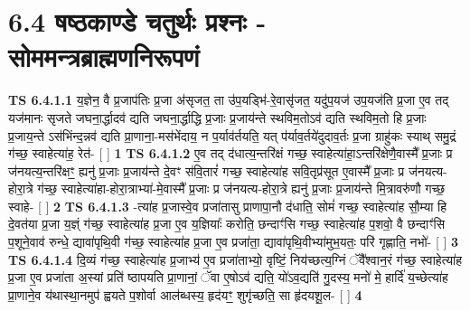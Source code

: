 \documentclass[17pt]{extarticle}
\begin{document}
     \section*{ 6.4       षष्ठकाण्डे चतुर्थः प्रश्नः - सोममन्त्रब्राह्मणनिरूपणं }
                                        \textbf{ TS 6.4.1.1} \newline
                  य॒ज्ञेन॒ वै प्र॒जाप॑तिः प्र॒जा अ॑सृजत॒ ता उ॑प॒यड्भि॑-रे॒वासृ॑जत॒ यदु॑प॒यज॑ उप॒यज॑ति प्र॒जा ए॒व तद् यज॑मानः सृजते जघना॒र्द्धादव॑ द्यति जघना॒र्द्धाद्धि प्र॒जाः प्र॒जाय॑न्ते स्थविम॒तोऽव॑ द्यति स्थविम॒तो हि प्र॒जाः प्र॒जाय॒न्ते ऽस॑भिंन्द॒न्नव॑ द्यति प्रा॒णाना॒-मस॑भेंदाय॒ न प॒र्याव॑र्तयति॒ यत् प॑र्याव॒र्तये॑दुदाव॒र्तः प्र॒जा ग्राहु॑कः स्याथ् समु॒द्रं ग॑च्छ॒ स्वाहेत्या॑ह॒ रेत॑- [  ] \textbf{  1} \newline
                  \newline
                                \textbf{ TS 6.4.1.2} \newline
                  ए॒व तद् द॑धात्य॒न्तरि॑क्षं गच्छ॒ स्वाहेत्या॑हा॒ऽन्तरि॑क्षेणै॒वास्मै᳚ प्र॒जाः प्र ज॑नयत्य॒न्तरि॑क्षꣳ॒॒ ह्यनु॑ प्र॒जाः प्र॒जाय॑न्ते दे॒वꣳ स॑वि॒तारं॑ गच्छ॒ स्वाहेत्या॑ह सवि॒तृप्र॑सूत ए॒वास्मै᳚ प्र॒जाः प्र ज॑नयत्य-होरा॒त्रे ग॑च्छ॒ स्वाहेत्या॑हा-होरा॒त्राभ्या॑-मे॒वास्मै᳚ प्र॒जाः प्र ज॑नयत्य-होरा॒त्रे ह्यनु॑ प्र॒जाः प्र॒जाय॑न्ते मि॒त्रावरु॑णौ गच्छ॒ स्वाहे- [  ] \textbf{  2} \newline
                  \newline
                                \textbf{ TS 6.4.1.3} \newline
                  -त्या॑ह प्र॒जास्वे॒व प्रजा॑तासु प्राणापा॒नौ द॑धाति॒ सोमं॑ गच्छ॒ स्वाहेत्या॑ह सौ॒म्या हि दे॒वत॑या प्र॒जा य॒ज्ञ्ं ग॑च्छ॒ स्वाहेत्या॑ह प्र॒जा ए॒व य॒ज्ञियाः᳚ करोति॒ छन्दाꣳ॑सि गच्छ॒ स्वाहेत्या॑ह प॒शवो॒ वै छन्दाꣳ॑सि प॒शूने॒वाव॑ रुन्धे॒ द्यावा॑पृथि॒वी ग॑च्छ॒ स्वाहेत्या॑ह प्र॒जा ए॒व प्रजा॑ता॒ द्यावा॑पृथि॒वीभ्या॑मुभ॒यतः॒ परि॑ गृह्णाति॒ नभो॑- [  ] \textbf{  3} \newline
                  \newline
                                \textbf{ TS 6.4.1.4} \newline
                  दि॒व्यं ग॑च्छ॒ स्वाहेत्या॑ह प्र॒जाभ्य॑ ए॒व प्रजा॑ताभ्यो॒ वृष्टिं॒ निय॑च्छत्य॒ग्निं ॅवै᳚श्वान॒रं ग॑च्छ॒ स्वाहेत्या॑ह प्र॒जा ए॒व प्रजा॑ता अ॒स्यां प्रति॑ ष्ठापयति प्रा॒णानां॒ ॅवा ए॒षोऽव॑ द्यति॒ यो॑ऽव॒द्यति॑ गु॒दस्य॒ मनो॑ मे॒ हार्दि॑ य॒च्छेत्या॑ह प्रा॒णाने॒व य॑थास्था॒नमुप॑ ह्वयते प॒शोर्वा आल॑ब्धस्य॒ हृद॑यꣳ॒॒ शुगृ॑च्छति॒ सा हृ॑दयशू॒ल- [  ] \textbf{  4} \newline
\end{document}
